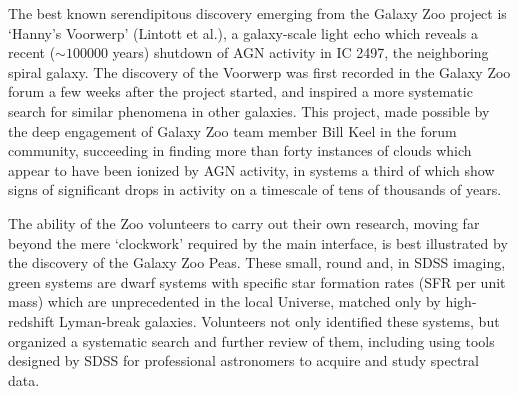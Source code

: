 \documentclass{ar2e}
\begin{document}


The best known serendipitous discovery emerging from the Galaxy Zoo project is
`Hanny's Voorwerp' (Lintott et al.), a galaxy-scale light echo which reveals a
recent ($\sim 100000$ years) shutdown of AGN activity in IC 2497, the
neighboring spiral galaxy. The discovery of the Voorwerp was first recorded in
the Galaxy Zoo forum a few weeks after the project started, and inspired a more
systematic search for similar phenomena in other galaxies. This project, made
possible by the deep engagement of Galaxy Zoo team member Bill Keel in the forum
community, succeeding in finding more than forty instances of clouds which
appear to have been ionized by AGN activity, in systems a third of which show
signs of significant drops in activity on a timescale of tens of thousands of
years. 

The ability of the Zoo volunteers to carry out their own research, moving far
beyond the mere `clockwork' required by the main interface, is best illustrated
by the discovery of the Galaxy Zoo Peas. These small, round and, in SDSS
imaging, green systems are dwarf systems with specific star formation rates (SFR
per unit mass) which are unprecedented in the local Universe, matched only by
high-redshift Lyman-break galaxies. Volunteers not only identified these
systems, but organized a systematic search and further review of them, including
using tools designed by SDSS for professional astronomers to acquire and study
spectral data. 
\end{document}
